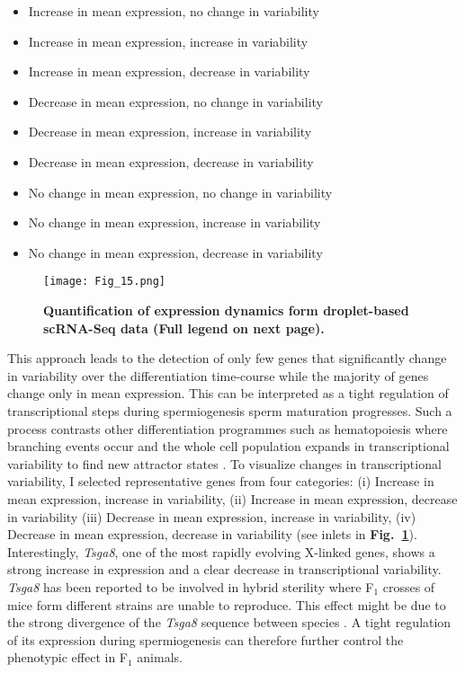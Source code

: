 \begin{itemize}
\itemsep0em 
\item Increase in mean expression, no change in variability
\item Increase in mean expression, increase in variability
\item Increase in mean expression, decrease in variability
\item Decrease in mean expression, no change in variability
\item Decrease in mean expression, increase in variability
\item Decrease in mean expression, decrease in variability
\item No change in mean expression, no change in variability
\item No change in mean expression, increase in variability
\item No change in mean expression, decrease in variability
\end{itemize}

\newpage

\begin{figure}[!h]
\centering
\texttt{[image: Fig\_15.png]}
\caption[Quantification of expression dynamics form droplet-based scRNA-Seq data]{\textbf{Quantification of expression dynamics form droplet-based scRNA-Seq data (Full legend on next page).}}
\label{fig3:linear_variability}
\end{figure}

\newpage

This approach leads to the detection of only few genes that significantly change in variability over the differentiation time-course while the majority of genes change only in mean expression. This can be interpreted as a tight regulation of transcriptional steps during spermiogenesis sperm maturation progresses. Such a process contrasts other differentiation programmes such as hematopoiesis where branching events occur and the whole cell population expands in transcriptional variability to find new attractor states \citep{Mojtahedi2016}. To visualize changes in transcriptional variability, I selected representative genes from four categories: (i) Increase in mean expression, increase in variability, (ii) Increase in mean expression, decrease in variability (iii) Decrease in mean expression, increase in variability, (iv) Decrease in mean expression, decrease in variability (see inlets in \textbf{Fig.~\ref{fig3:linear_variability}}). Interestingly, \textit{Tsga8}, one of the most rapidly evolving X-linked genes, shows a strong increase in expression and a clear decrease in transcriptional variability. \emph{Tsga8} has been reported to be involved in hybrid sterility where F$_1$ crosses of mice form different strains are unable to reproduce. This effect might be due to the strong divergence of the \emph{Tsga8} sequence between species \citep{Good2011}. A tight regulation of its expression during spermiogenesis can therefore further control the phenotypic effect in F$_1$ animals.

